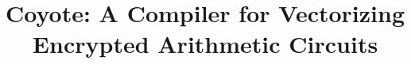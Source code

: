 \documentclass[pageno]{jpaper}
\title{Coyote: A Compiler for Vectorizing Encrypted Arithmetic Circuits}
\author{}
\date{}
\begin{document}
\maketitle









\pagebreak
\clearpage
% 


\end{document}
